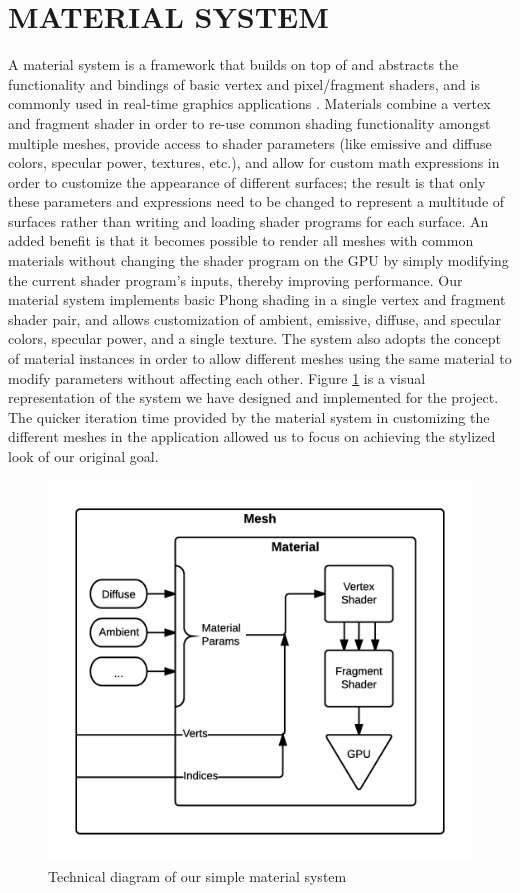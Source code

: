 \documentclass[a4paper,twoside]{article}
\begin{document}
\section{\uppercase{Material System}}
\label{sec:mat_sys}
\noindent A material system is a framework that builds on top of and abstracts the functionality and bindings of basic vertex and pixel/fragment shaders, and is commonly used in real-time graphics applications \cite{gengines}. Materials combine a vertex and fragment shader in order to re-use common shading functionality amongst multiple meshes, provide access to shader parameters (like emissive and diffuse colors, specular power, textures, etc.), and allow for custom math expressions in order to customize the appearance of different surfaces; the result is that only these parameters and expressions need to be changed to represent a multitude of surfaces rather than writing and loading shader programs for each surface. An added benefit is that it becomes possible to render all meshes with common materials without changing the shader program on the GPU by simply modifying the current shader program's inputs, thereby improving performance.
Our material system implements basic Phong shading in a single vertex and fragment shader pair, and allows customization of ambient, emissive, diffuse, and specular colors, specular power, and a single texture. The system also adopts the concept of material instances in order to allow different meshes using the same material to modify parameters without affecting each other. Figure \ref{fig_ms} is a visual representation of the system we have designed and implemented for the project. The quicker iteration time provided by the material system in customizing the different meshes in the application allowed us to focus on achieving the stylized look of our original goal.

\begin{figure}
\includegraphics[scale=0.75]{./images/materials/ms_overview.png}
\caption{Technical diagram of our simple material system}
\label{fig_ms}
\end{figure}
\end{document}
